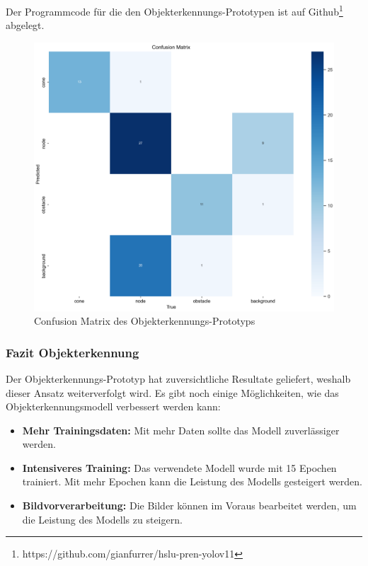 \documentclass[../main.tex]{subfiles}
\begin{document}
Der Programmcode für die den Objekterkennungs-Prototypen ist auf Github\footnote{https://github.com/gianfurrer/hslu-pren-yolov11} abgelegt.

\begin{figure}[H]
\includegraphics[width=\textwidth]{img/prototyping/objekterkennung/ConfusionMatrix.png}
\caption{Confusion Matrix des Objekterkennungs-Prototyps}
\label{img:objectdetection_prototype_confusion_matrix}
\end{figure}

\subsubsection{Fazit Objekterkennung}

Der Objekterkennungs-Prototyp hat zuversichtliche Resultate geliefert, weshalb dieser Ansatz weiterverfolgt wird. Es gibt noch einige Möglichkeiten, wie das Objekterkennungsmodell verbessert werden kann:
\begin{itemize}
    \item \textbf{Mehr Trainingsdaten:} Mit mehr Daten sollte das Modell zuverlässiger werden.
    \item \textbf{Intensiveres Training:} Das verwendete Modell wurde mit 15 Epochen trainiert. Mit mehr Epochen kann die Leistung des Modells gesteigert werden.
    \item \textbf{Bildvorverarbeitung:} Die Bilder können im Voraus bearbeitet werden, um die Leistung des Modells zu steigern.
\end{itemize}
\end{document}
